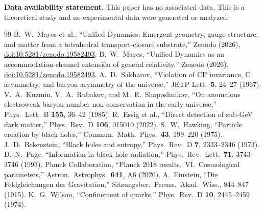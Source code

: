 \documentclass[11pt,twocolumn]{article}
\begin{document}
\smallskip
\noindent\textbf{Data availability statement.}
This paper has no associated data.
This is a theoretical study and no experimental data were generated or analyzed.

\begin{thebibliography}{99}
 B.~W.~Mayes et al., ``Unified Dynamics: Emergent geometry, gauge structure, and matter from a tetrahedral transport-closure substrate,'' Zenodo (2026), \href{https://doi.org/10.5281/zenodo.19582493}{doi:10.5281/zenodo.19582493}.
 B.~W.~Mayes, ``Unified Dynamics as an accommodation-channel extension of general relativity,'' Zenodo (2026), \href{https://doi.org/10.5281/zenodo.19582493}{doi:10.5281/zenodo.19582493}.
 A.~D.~Sakharov, ``Violation of CP invariance, C asymmetry, and baryon asymmetry of the universe,'' JETP Lett.\ \textbf{5}, 24--27 (1967).
 V.~A.~Kuzmin, V.~A.~Rubakov, and M.~E.~Shaposhnikov, ``On anomalous electroweak baryon-number non-conservation in the early universe,'' Phys.\ Lett.\ B \textbf{155}, 36--42 (1985).
 R.~Essig et al., ``Direct detection of sub-GeV dark matter,'' Phys.\ Rev.\ D \textbf{106}, 015010 (2022).
 S.~W.~Hawking, ``Particle creation by black holes,'' Commun.\ Math.\ Phys.\ \textbf{43}, 199--220 (1975).
 J.~D.~Bekenstein, ``Black holes and entropy,'' Phys.\ Rev.\ D \textbf{7}, 2333--2346 (1973).
 D.~N.~Page, ``Information in black hole radiation,'' Phys.\ Rev.\ Lett.\ \textbf{71}, 3743--3746 (1993).
 Planck Collaboration, ``Planck 2018 results.\ VI.\ Cosmological parameters,'' Astron.\ Astrophys.\ \textbf{641}, A6 (2020).
 A.~Einstein, ``Die Feldgleichungen der Gravitation,'' Sitzungsber.\ Preuss.\ Akad.\ Wiss., 844--847 (1915).
 K.~G.~Wilson, ``Confinement of quarks,'' Phys.\ Rev.\ D \textbf{10}, 2445--2459 (1974).
\end{thebibliography}
\end{document}
